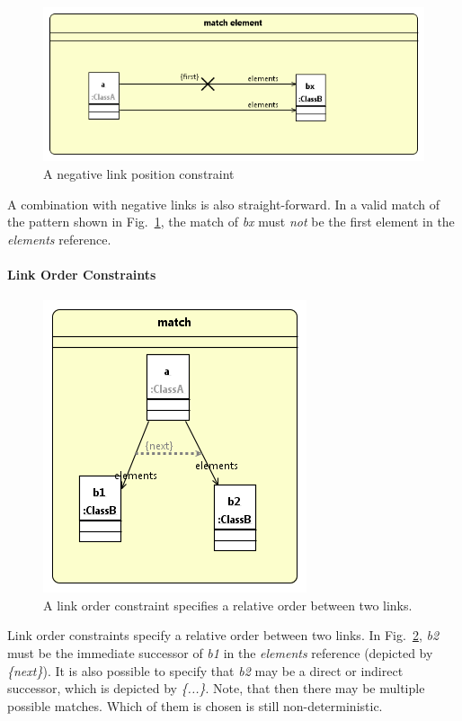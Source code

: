 
\begin{figure}[htb]
\center
\includegraphics[width=0.75\columnwidth]{figures/linkPositionConstraint2.png}
\caption{A negative link position constraint}
\label{fig:linkPositionConstraints:linkPositionConstraint2}
\end{figure}

A combination with negative links is also straight-forward. In a valid match of the pattern shown in Fig.~\ref{fig:linkPositionConstraints:linkPositionConstraint2}, the match of \emph{bx} must \emph{not} be the first element in the \emph{elements} reference.

\paragraph{Link Order Constraints}

\begin{figure}
\center
\includegraphics[width=0.4\columnwidth]{figures/linkOrderConstraint1.png}
\caption{A link order constraint specifies a relative order between two links.}
\label{fig:linkOrderConstraints:linkOrderConstaint1}
\end{figure}

Link order constraints specify a relative order between two links. In Fig.~\ref{fig:linkOrderConstraints:linkOrderConstaint1}, \emph{b2} must be the immediate successor of \emph{b1} in the \emph{elements} reference (depicted by \emph{\{next\}}). It is also possible to specify that \emph{b2} may be a direct or indirect successor, which is depicted by \emph{\{...\}}. Note, that then there may be multiple possible matches. Which of them is chosen is still non-deterministic.


